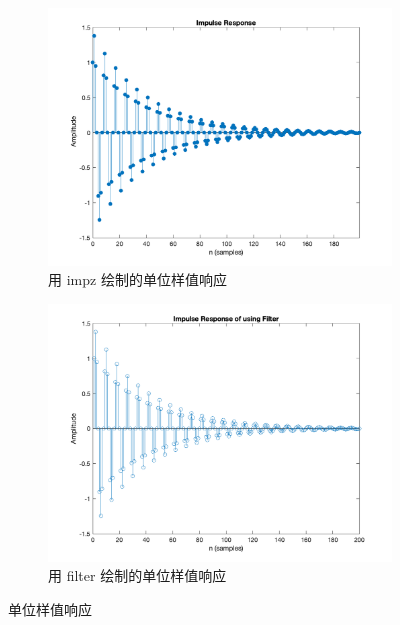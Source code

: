 \documentclass[a4paper]{article}  %
\begin{document}
\begin{figure}[ht]
    \begin{subfigure}[b]{0.48\textwidth}
        \centering
        \includegraphics[width=\textwidth]{asserts/1_1_impz.png}
        \caption{
            用 impz 绘制的单位样值响应
        }\label{fig:1_1_impz}
    \end{subfigure}
    \hfill
    \begin{subfigure}[b]{0.48\textwidth}
        \centering
        \includegraphics[width=\textwidth]{asserts/1_1_impz_filter.png}
        \caption{
            用 filter 绘制的单位样值响应
        }\label{fig:1_1_impz_filter}
    \end{subfigure}
    \caption{
        单位样值响应
    }
\end{figure}
\end{document}

